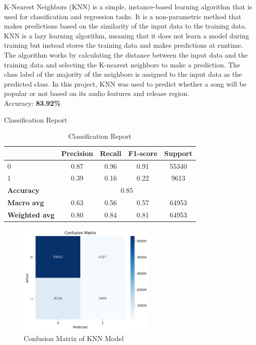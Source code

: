 K-Nearest Neighbors (KNN) is a simple, instance-based learning algorithm that is used for classification and regression tasks. It is a non-parametric method that makes predictions based on the similarity of the input data to the training data. KNN is a lazy learning algorithm, meaning that it does not learn a model during training but instead stores the training data and makes predictions at runtime. The algorithm works by calculating the distance between the input data and the training data and selecting the K-nearest neighbors to make a prediction. The class label of the majority of the neighbors is assigned to the input data as the predicted class. In this project, KNN was used to predict whether a song will be popular or not based on its audio features and release region. \\

Accuracy: \textbf{83.92\%}


Classification Report
\begin{table}[h]
    \centering
    \begin{tabular}{lcccc}
        \toprule
        & \textbf{Precision} & \textbf{Recall} & \textbf{F1-score} & \textbf{Support} \\
        \midrule
        0 & 0.87 & 0.96 & 0.91 & 55340 \\
        1 & 0.39 & 0.16 & 0.22 & 9613 \\
        \midrule
        \textbf{Accuracy} & \multicolumn{4}{c}{0.85} \\
        \textbf{Macro avg} & 0.63 & 0.56 & 0.57 & 64953 \\
        \textbf{Weighted avg} & 0.80 & 0.84 & 0.81 & 64953 \\
        \bottomrule
    \end{tabular}
    \caption{Classification Report}
    \label{tab:classification_report}
\end{table}

\begin{figure}[h] 
    \centering 
    \includegraphics[width=0.6\textwidth]{media/knn-confusion_matrix.jpg}
    \caption{Confusion Matrix of KNN Model}

\end{figure}

